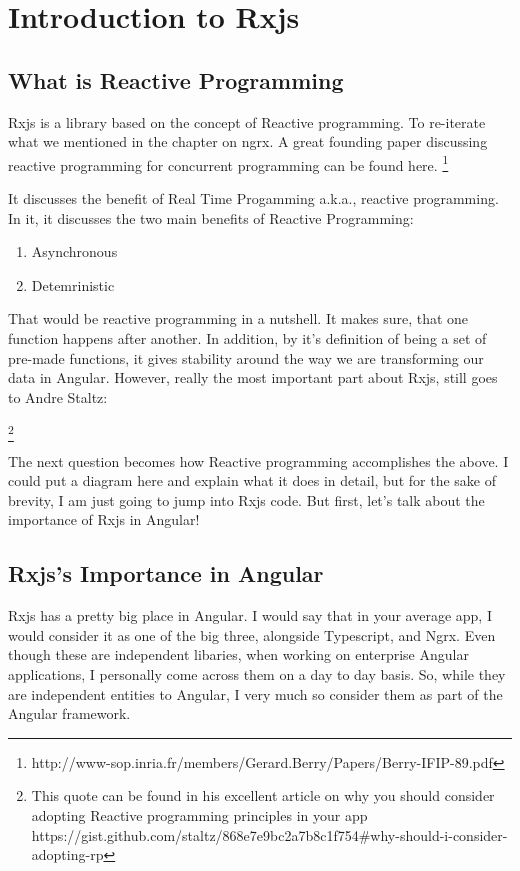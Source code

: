 \chapter{ Introduction to Rxjs }

\section{ What is Reactive Programming}

Rxjs is a library based on the concept of Reactive programming. To re-iterate 
what we mentioned in the chapter on ngrx. A great founding paper discussing 
reactive programming for concurrent programming can be found here. 
\footnote{http://www-sop.inria.fr/members/Gerard.Berry/Papers/Berry-IFIP-89.pdf}

It discusses the benefit of Real Time Progamming a.k.a., reactive programming.
In it, it discusses the two main benefits of Reactive Programming:
\begin{enumerate}
  \item Asynchronous
  \item Detemrinistic
\end{enumerate}

That would be reactive programming in a nutshell. It makes sure, that one 
function happens after another. In addition, by it's definition of being 
a set of pre-made functions, it gives stability around the way we are 
transforming our data in Angular. However, really the most important part 
about Rxjs, still goes to Andre Staltz: 

\begin{quote}
\end{quote} 
\footnote{This quote can be found in his excellent article on why you should 
consider adopting Reactive programming principles in your app 
https://gist.github.com/staltz/868e7e9bc2a7b8c1f754\#why-should-i-consider-adopting-rp}

The next question becomes how Reactive programming accomplishes the above. I 
could put a diagram here and explain what it does in detail, but for the sake 
of brevity, I am just going to jump into Rxjs code. But first, let's talk 
about the importance of Rxjs in Angular!

\section{Rxjs's Importance in Angular }
Rxjs has a pretty big place in Angular. I would say that in your average app, 
I would consider it as one of the big three, alongside Typescript, and Ngrx. 
Even though these are independent libaries, when working on enterprise Angular
applications, I personally come across them on a day to day basis. So, while 
they are independent entities to Angular, I very much so consider them as part 
of the Angular framework. 

